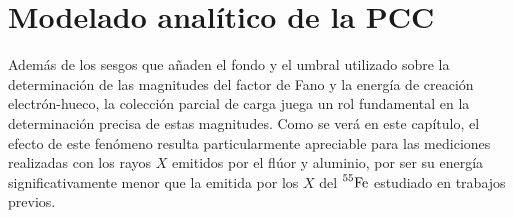\chapter{Modelado analítico de la PCC \label{chap:ModeloPCC}}
\noindent Además de los sesgos que añaden el fondo y el umbral utilizado sobre la determinación de las magnitudes del factor de Fano y la energía de creación electrón-hueco, la colección parcial de carga juega un rol fundamental en la determinación precisa de estas magnitudes. Como se verá en este capítulo, el efecto de este fenómeno resulta particularmente apreciable para las mediciones realizadas con los rayos $X$ emitidos por el flúor y aluminio, por ser su energía significativamente menor que la emitida por los $X$ del $\prescript{55}{}{\mbox{Fe}}$ estudiado en trabajos previos\cite{TesisAndi,TesisKevin,Rodrigues}.

